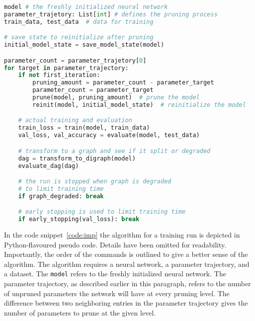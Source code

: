 \begin{minipage}{\linewidth} %
\begin{lstlisting}[language=Python,caption={[Iterative Magnitude Pruning]Iterative magnitude pruning with parameter resetting, using PyTorch~\autocite{pytorch}; Python pseudo code
},captionpos=b, label={code:imp}]
model # the freshly initialized neural network 
parameter_trajetory: List[int] # defines the pruning process
train_data, test_data  # data for training

# save state to reinitialize after pruning
initial_model_state = save_model_state(model)

parameter_count = parameter_trajetory[0]
for target in parameter_trajectory:
    if not first_iteration:
        pruning_amount = parameter_count - parameter_target
        parameter_count = parameter_target
        prune(model, pruning_amount)  # prune the model 
        reinit(model, initial_model_state)  # reinitialize the model

    # actual training and evaluation
    train_loss = train(model, train_data)
    val_loss, val_accuracy = evaluate(model, test_data)

    # transform to a graph and see if it split or degraded
    dag = transform_to_digraph(model)
    evaluate_dag(dag)

    # the run is stopped when graph is degraded 
    # to limit training time
    if graph_degraded: break

    # early stopping is used to limit training time
    if early_stopping(val_loss): break
\end{lstlisting}
\end{minipage}

In the code snippet~\ref{code:imp} the algorithm for a training run is depicted in Python-flavoured pseudo code.
Details have been omitted for readability.
Importantly, the order of the commands is outlined to give a better sense of the algorithm.
The algorithm requires a neural network, a parameter trajectory, and a dataset.
The \lstinline{model} refers to the freshly initialized neural network.
The parameter trajectory, as described earlier in this paragraph, refers to the number of unpruned parameters the network will have at every pruning level.
The difference between two neighboring entries in the parameter trajectory gives the number of parameters to prune at the given level.
    

